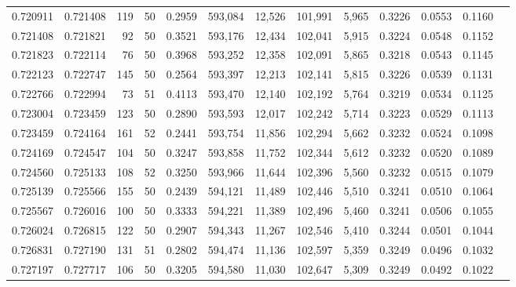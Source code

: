 \begin{tabular}{rrrrrrrrrrrrr}
0.720911 & 0.721408 &   119 &  50 &                                     0.2959 & 593,084 &  12,526 & 101,991 &   5,965 & 0.3226 & 0.0553 & 0.1160 \\
0.721408 & 0.721821 &    92 &  50 &                                     0.3521 & 593,176 &  12,434 & 102,041 &   5,915 & 0.3224 & 0.0548 & 0.1152 \\
0.721823 & 0.722114 &    76 &  50 &                                     0.3968 & 593,252 &  12,358 & 102,091 &   5,865 & 0.3218 & 0.0543 & 0.1145 \\
0.722123 & 0.722747 &   145 &  50 &                                     0.2564 & 593,397 &  12,213 & 102,141 &   5,815 & 0.3226 & 0.0539 & 0.1131 \\
0.722766 & 0.722994 &    73 &  51 &                                     0.4113 & 593,470 &  12,140 & 102,192 &   5,764 & 0.3219 & 0.0534 & 0.1125 \\
0.723004 & 0.723459 &   123 &  50 &                                     0.2890 & 593,593 &  12,017 & 102,242 &   5,714 & 0.3223 & 0.0529 & 0.1113 \\
0.723459 & 0.724164 &   161 &  52 &                                     0.2441 & 593,754 &  11,856 & 102,294 &   5,662 & 0.3232 & 0.0524 & 0.1098 \\
0.724169 & 0.724547 &   104 &  50 &                                     0.3247 & 593,858 &  11,752 & 102,344 &   5,612 & 0.3232 & 0.0520 & 0.1089 \\
0.724560 & 0.725133 &   108 &  52 &                                     0.3250 & 593,966 &  11,644 & 102,396 &   5,560 & 0.3232 & 0.0515 & 0.1079 \\
0.725139 & 0.725566 &   155 &  50 &                                     0.2439 & 594,121 &  11,489 & 102,446 &   5,510 & 0.3241 & 0.0510 & 0.1064 \\
0.725567 & 0.726016 &   100 &  50 &                                     0.3333 & 594,221 &  11,389 & 102,496 &   5,460 & 0.3241 & 0.0506 & 0.1055 \\
0.726024 & 0.726815 &   122 &  50 &                                     0.2907 & 594,343 &  11,267 & 102,546 &   5,410 & 0.3244 & 0.0501 & 0.1044 \\
0.726831 & 0.727190 &   131 &  51 &                                     0.2802 & 594,474 &  11,136 & 102,597 &   5,359 & 0.3249 & 0.0496 & 0.1032 \\
0.727197 & 0.727717 &   106 &  50 &                                     0.3205 & 594,580 &  11,030 & 102,647 &   5,309 & 0.3249 & 0.0492 & 0.1022 \\

\end{tabular}
